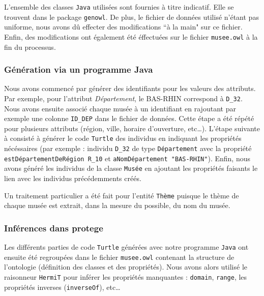 \documentclass{article}
\begin{document}
\vspace{0.3cm}

L'ensemble des classes \texttt{Java} utilisées sont fournies à titre indicatif.
Elle se trouvent dans le package \texttt{genowl}. De plus, le fichier de données
utilisé n'étant pas uniforme, nous avons dû effecter des modifications ``à la
main" sur ce fichier. Enfin, des modifications ont également été éffectuées sur
le fichier \texttt{musee.owl} à la fin du processus.

\subsubsection{Génération via un programme Java}

Nous avons commencé par générer des identifiants pour les valeurs des
attributs. Par exemple, pour l'attribut \textit{Département}, le BAS-RHIN
correspond à \texttt{D\_32}. Nous avons ensuite associé chaque musée à un
identifiant en rajoutant par exemple une colonne \texttt{ID\_DEP} dans le
fichier de données.
Cette étape a été répété pour plusieurs attributs (région, ville, horaire d'ouverture, etc\ldots).
L'étape suivante à consisté à générer le code \texttt{Turtle} des individus en
indiquant les propriétés nécéssaires (par exemple : individu \texttt{D\_32} de
type \texttt{Département} avec la propriété \texttt{estDépartementDeRégion
R\_10} et \texttt{aNomDépartement "BAS-RHIN"}). Enfin, nous avons généré les
individus de la classe \texttt{Musée} en ajoutant les propriétés faisants le
lien avec les individus précédemments créés.

\vspace{0.3cm}

Un traitement particulier a été fait pour l'entité \texttt{Thème} puisque le
thème de chaque musée est extrait, dans la mesure du possible, du nom du musée.

\subsubsection{Inférences dans protege}

Les différents parties de code \texttt{Turtle} générées avec notre programme
\texttt{Java} ont ensuite été regroupées dans le fichier \texttt{musee.owl}
contenant la structure de l'ontologie (définition des classes et des propriétés). Nous avons alors
utilisé le raisonneur \texttt{HermiT} pour inférer les propriétés manquantes
: \texttt{domain}, \texttt{range}, les propriétés inverses (\texttt{inverseOf}),
etc\ldots
\end{document}
